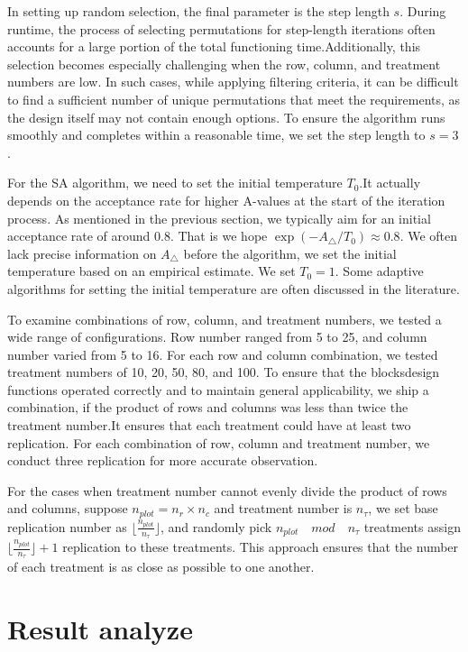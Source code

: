 \documentclass[
  a4paper,
  oneside,
  openany,
  12pt,
  onecolumn]{book}
\theoremstyle{definition}
\theoremstyle{plain}
\theoremstyle{remark}
\begin{document}
In setting up random selection, the final parameter is the step length
\(s\). During runtime, the process of selecting permutations for
step-length iterations often accounts for a large portion of the total
functioning time.Additionally, this selection becomes especially
challenging when the row, column, and treatment numbers are low. In such
cases, while applying filtering criteria, it can be difficult to find a
sufficient number of unique permutations that meet the requirements, as
the design itself may not contain enough options. To ensure the
algorithm runs smoothly and completes within a reasonable time, we set
the step length to \(s=3\).

For the SA algorithm, we need to set the initial temperature \(T_0\).It
actually depends on the acceptance rate for higher A-values at the start
of the iteration process. As mentioned in the previous section, we
typically aim for an initial acceptance rate of around 0.8. That is we
hope \(\exp(-A_{\bigtriangleup}/T_0) \approx 0.8\). We often lack
precise information on \(A_{\bigtriangleup}\) before the algorithm, we
set the initial temperature based on an empirical estimate. We set
\(T_0=1\). Some adaptive algorithms for setting the initial temperature
are often discussed in the literature.

To examine combinations of row, column, and treatment numbers, we tested
a wide range of configurations. Row number ranged from 5 to 25, and
column number varied from 5 to 16. For each row and column combination,
we tested treatment numbers of 10, 20, 50, 80, and 100. To ensure that
the blocksdesign functions operated correctly and to maintain general
applicability, we ship a combination, if the product of rows and columns
was less than twice the treatment number.It ensures that each treatment
could have at least two replication. For each combination of row, column
and treatment number, we conduct three replication for more accurate
observation.

For the cases when treatment number cannot evenly divide the product of
rows and columns, suppose \(n_{plot}=n_r\times n_c\) and treatment
number is \(n_{\tau}\), we set base replication number as
\(\lfloor \frac{n_{plot}}{n_{\tau}} \rfloor\), and randomly pick
\(n_{plot}\quad mod\quad n_{\tau}\) treatments assign
\(\lfloor \frac{n_{plot}}{n_{\tau}} \rfloor+1\) replication to these
treatments. This approach ensures that the number of each treatment is
as close as possible to one another.

\section{Result analyze}\label{result-analyze}
\end{document}
